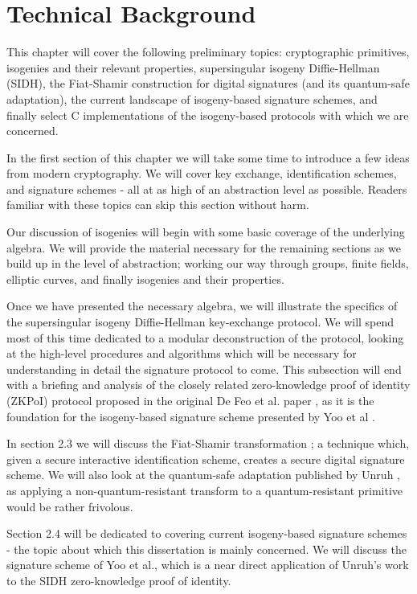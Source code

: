 \chapter{Technical Background}

This chapter will cover the following preliminary topics: cryptographic primitives, isogenies and their relevant properties, supersingular isogeny Diffie-Hellman (SIDH), the Fiat-Shamir construction for digital signatures (and its quantum-safe adaptation), the current landscape of isogeny-based signature schemes, and finally select C implementations of the isogeny-based protocols with which we are concerned.

In the first section of this chapter we will take some time to introduce a few ideas from modern cryptography. We will cover key exchange, identification schemes, and signature schemes - all at as high of an abstraction level as possible. Readers familiar with these topics can skip this section without harm.

Our discussion of isogenies will begin with some basic coverage of the underlying algebra. We will provide the material necessary for the remaining sections as we build up in the level of abstraction; working our way through groups, finite fields, elliptic curves, and finally isogenies and their properties.

Once we have presented the necessary algebra, we will illustrate the specifics of the supersingular isogeny Diffie-Hellman key-exchange protocol. We will spend most of this time dedicated to a modular deconstruction of the protocol, looking at the high-level procedures and algorithms which will be necessary for understanding in detail the signature protocol to come. This subsection will end with a briefing and analysis of the closely related zero-knowledge proof of identity (ZKPoI) protocol proposed in the original De Feo et al. paper \cite{djp}, as it is the foundation for the isogeny-based signature scheme presented by Yoo et al \cite{yoo}.

In section 2.3 we will discuss the Fiat-Shamir transformation \cite{sigs}; a technique which, given a secure interactive identification scheme, creates a secure digital signature scheme. We will also look at the quantum-safe adaptation published by Unruh \cite{unruh}, as applying a non-quantum-resistant transform to a quantum-resistant primitive would be rather frivolous.

Section 2.4 will be dedicated to covering current isogeny-based signature schemes - the topic about which this dissertation is mainly concerned. We will discuss the signature scheme of Yoo et al., which is a near direct application of Unruh's work to the SIDH zero-knowledge proof of identity.

